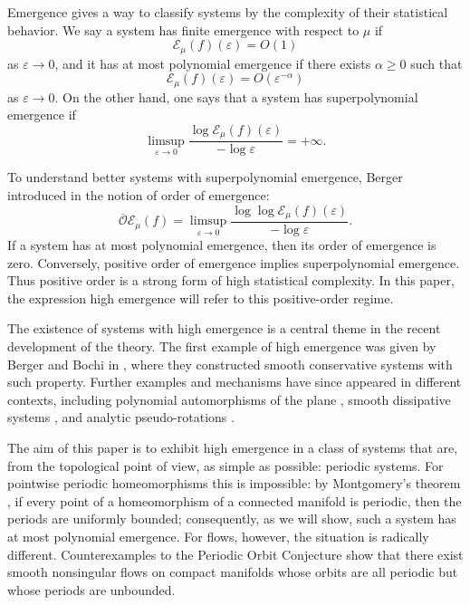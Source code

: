 \documentclass[11pt,reqno]{amsart}
\theoremstyle{plain}
\theoremstyle{definition}
\theoremstyle{remark}
\theoremstyle{plain}
\numberwithin{equation}{section}
\begin{document}
Emergence gives a way to classify systems by the complexity of their statistical behavior. We say a system has finite emergence with respect to $\mu$ if
\begin{equation*}
        \mathcal E_\mu(f)(\varepsilon)=O(1)
\end{equation*}
as $\varepsilon\to0$, and it has at most polynomial emergence if there exists
$\alpha\ge0$ such that
\begin{equation*}
        \mathcal E_\mu(f)(\varepsilon)=O(\varepsilon^{-\alpha})
\end{equation*}
as $\varepsilon\to0$. On the other hand, one says that a system has
superpolynomial emergence if
\begin{equation*}
        \limsup_{\varepsilon\to0}
        \frac{\log \mathcal E_\mu(f)(\varepsilon)}
        {-\log\varepsilon}
        =
        +\infty.
\end{equation*}

To understand better systems with superpolynomial emergence, Berger introduced in
\cite{berger2020complexities} the notion of order of emergence:
\begin{equation*}
        \overline{\mathcal O}\mathcal E_\mu(f)
        =
        \limsup_{\varepsilon\to0}
        \frac{\log\log \mathcal E_\mu(f)(\varepsilon)}
        {-\log\varepsilon}.
\end{equation*}
If a system has at most polynomial emergence, then its order of emergence is
zero. Conversely, positive order of emergence implies superpolynomial
emergence. Thus positive order is a strong form of high statistical complexity.
In this paper, the expression high emergence will refer to this positive-order
regime.

The existence of systems with high emergence is a central theme in the recent development of the theory. The first example of high emergence was given by Berger and Bochi in \cite{bergerbochi}, where they constructed smooth conservative systems with such property. Further examples and mechanisms have since appeared in different contexts, including polynomial automorphisms of the plane \cite{berger2023emergence}, smooth dissipative systems \cite{kiriki2022emergence}, and analytic pseudo-rotations \cite{berger22,delaporte2025analytic}. 

The aim of this paper is to exhibit high emergence in a class of systems that are, from the topological point of view, as simple as possible: periodic systems. For pointwise periodic homeomorphisms this is impossible: by Montgomery's theorem \cite{montgomery}, if every point of a homeomorphism of a connected manifold is periodic, then the periods are uniformly bounded; consequently, as we will show, such a system has at most polynomial emergence. For flows, however, the situation is radically different. Counterexamples to the Periodic Orbit Conjecture show that there exist smooth nonsingular flows on compact manifolds whose orbits are all periodic but whose periods are unbounded.
\end{document}
